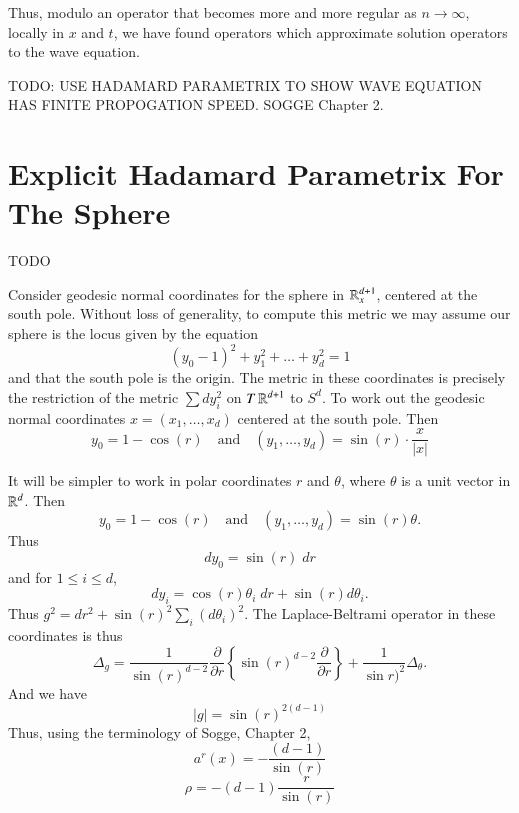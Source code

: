 Thus, modulo an operator that becomes more and more regular as $n \to \infty$, locally in $x$ and $t$, we have found operators which approximate solution operators to the wave equation.

TODO: USE HADAMARD PARAMETRIX TO SHOW WAVE EQUATION HAS FINITE PROPOGATION SPEED. SOGGE Chapter 2.







\section{Explicit Hadamard Parametrix For The Sphere}

TODO

Consider geodesic normal coordinates for the sphere in $\operatorname{\mathbb{R}}^{d+1}_x$, centered at the south pole. Without loss of generality, to compute this metric we may assume our sphere is the locus given by the equation
%
\[ (y_0 - 1)^2 + y_1^2 + \dots + y_d^2 = 1 \]
%
and that the south pole is the origin. The metric in these coordinates is precisely the restriction of the metric $\sum dy_i^2$ on $T \operatorname{\mathbb{R}}^{d+1}$ to $S^d$. To work out the geodesic normal coordinates $x = (x_1,\dots,x_d)$ centered at the south pole. Then
%
\[ y_0 = 1 - \cos(r) \quad\text{and}\quad (y_1,\dots,y_d) = \sin(r) \cdot \frac{x}{|x|} \]


It will be simpler to work in polar coordinates $r$ and $\theta$, where $\theta$ is a unit vector in $\operatorname{\mathbb{R}}^d$. Then
%
\[ y_0 = 1 - \cos(r) \quad\text{and}\quad (y_1,\dots,y_d) = \sin(r) \theta. \]
%
Thus
%
\[ dy_0 = \sin(r)\; dr \]
%
and for $1 \leq i \leq d$,
%
\[ dy_i = \cos(r) \theta_i\; dr + \sin(r) d\theta_i. \]
%
%
%
%
%
Thus $g^2 = dr^2 + \sin(r)^2 \sum_i (d\theta_i)^2$. The Laplace-Beltrami operator in these coordinates is thus
% 
\[ \Delta_g = \frac{1}{\sin(r)^{d-2}} \frac{\partial}{\partial r} \left\{ \sin(r)^{d-2} \frac{\partial}{\partial r} \right\} + \frac{1}{\sin r)^2} \Delta_\theta. \]
%
And we have
%
\[ |g| = \sin(r)^{2(d-1)} \]
%
Thus, using the terminology of Sogge, Chapter 2,
%
\[ a^r(x) = - \frac{(d-1)}{\sin(r)} \]
%
\[ \rho = - (d-1) \frac{r}{\sin(r)} \]



